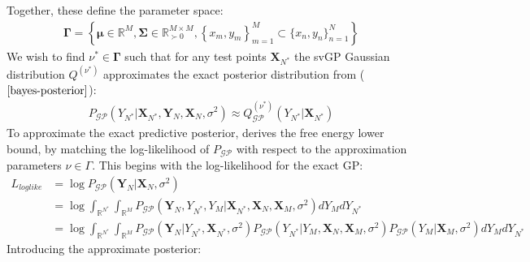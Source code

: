 \documentclass{article}
\newcommand{\GP}{\operatorname{\mathcal{GP}}}
\numberwithin{equation}{section}
\begin{document}
Together, these define the parameter space:
\begin{align}
    \mathbf{\Gamma} = \left\{\boldsymbol{\mu} \in \mathbb{R}^{M}, \mathbf{\Sigma} \in \mathbb{R}^{M\times M}_{\succ 0}, \left\{x_m, y_m\right\}_{m=1}^{M} \subset \{x_n, y_n\}_{n=1}^{N}\right\}
    \label{svgp-parameter-space}
\end{align}
We wish to find $\nu^* \in \mathbf{\Gamma}$ such that for any test points $\mathbf{X}_{N^*}$ the svGP Gaussian distribution $Q^{(\nu^*)}$ approximates the exact posterior distribution from ($\ref{bayes-posterior}$):
\begin{align}
    P_{\GP}\left(Y_{N^*} \vert \mathbf{X}_{N^*}, \mathbf{Y}_N, \mathbf{X}_N, \sigma^2 \right) \approx Q_{\GP}^{(\nu^*)}\left(Y_{N^*} \vert \mathbf{X}_{N^*}\right)
    \label{svgp-desired-approximation}
\end{align}
To approximate the exact predictive posterior, \cite{titsias2009variational} derives the free energy lower bound, by matching the log-likelihood of $P_{\GP}$ with respect to the approximation parameters $\nu \in \Gamma$. This begins with the log-likelihood for the exact GP:
\begin{align}
    L_{loglike} &= \log P_{\GP}\left(\mathbf{Y}_N \vert \mathbf{X}_N, \sigma^2\right)
    \\ &= \log \int_{\mathbb{R}^{N^*}}\int_{\mathbb{R}^{M}} P_{\GP}\left(\mathbf{Y}_N, Y_{N^*}, Y_{M} \vert \mathbf{X}_{N^*}, \mathbf{X}_N, \mathbf{X}_{M}, \sigma^2\right) d Y_{M} d Y_{N^*}
    \\ &= \log \int_{\mathbb{R}^{N^*}}\int_{\mathbb{R}^{M}} P_{\GP}\left(\mathbf{Y}_N\vert Y_{N^*}, \mathbf{X}_{N^*}, \sigma^2\right) P_{\GP}\left(Y_{N^*} \vert Y_{M}, \mathbf{X}_N, \mathbf{X}_{M}, \sigma^2\right) P_{\GP}\left(Y_{M}\vert \mathbf{X}_{M}, \sigma^2 \right) d Y_{M} d Y_{N^*}
    \label{log-like}
\end{align}
Introducing the approximate posterior:
\end{document}

